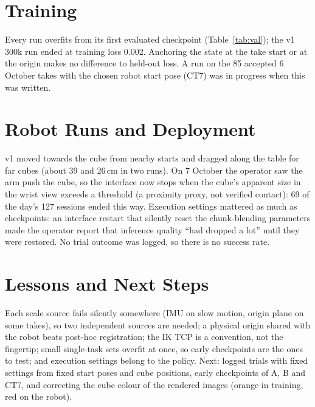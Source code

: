 \documentclass[conference,10pt]{IEEEtran}
\begin{document}
\section{Training}
\begin{table}[t]
\centering\footnotesize\setlength{\tabcolsep}{4pt}
\caption{Held-out loss (masked MSE) by checkpoint; training-subset loss in parentheses.}
\label{tab:val}
\end{table}
Every run overfits from its first evaluated checkpoint (Table~\ref{tab:val}); the v1 300k run ended at training loss 0.002.
Anchoring the state at the take start or at the origin makes no difference to held-out loss. A run on the 85 accepted 6 October
takes with the chosen robot start pose (CT7) was in progress when this was written.

\section{Robot Runs and Deployment}
v1 moved towards the cube from nearby starts and dragged along the table for far cubes (about 39 and 26\,cm in two runs). On 7
October the operator saw the arm push the cube, so the interface now stops when the cube's apparent size in the wrist view exceeds
a threshold (a proximity proxy, not verified contact): 69 of the day's 127 sessions ended this way. Execution settings mattered as
much as checkpoints: an interface restart that silently reset the chunk-blending parameters made the operator report that
inference quality ``had dropped a lot'' until they were restored. No trial outcome was logged, so there is no success rate.

\section{Lessons and Next Steps}
Each scale source fails silently somewhere (IMU on slow motion, origin plane on some takes), so two independent sources are
needed; a physical origin shared with the robot beats post-hoc registration; the IK TCP is a convention, not the fingertip; small
single-task sets overfit at once, so early checkpoints are the ones to test; and execution settings belong to the policy. Next:
logged trials with fixed settings from fixed start poses and cube positions, early checkpoints of A, B and CT7, and correcting
the cube colour of the rendered images (orange in training, red on the robot).
\end{document}
